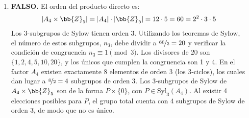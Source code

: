 \documentclass[12pt]{article}
\begin{document}
\begin{ejercicio}[1.0 punto]
\begin{enumerate}[label=\arabic*)]
            \item \textbf{FALSO.} El orden del producto directo es:
            $$|A_4 \times \bb{Z}_5| = |A_4| \cdot |\bb{Z}_5| = 12 \cdot 5 = 60 = 2^2 \cdot 3 \cdot 5$$ Los 3-subgrupos de Sylow tienen orden 3. Utilizando los teoremas de Sylow, el número de estos subgrupos, $n_3$, debe dividir a $\nicefrac{60}{3} = 20$ y verificar la condición de congruencia $n_3 \equiv 1 \pmod 3$. Los divisores de 20 son $\{1, 2, 4, 5, 10, 20\}$, y los únicos que cumplen la congruencia son 1 y 4. En el factor $A_4$ existen exactamente 8 elementos de orden 3 (los 3-ciclos), los cuales dan lugar a $\nicefrac{8}{2} = 4$ subgrupos de orden 3. Los 3-subgrupos de Sylow de $A_4 \times \bb{Z}_5$ son de la forma $P \times \{0\}$, con $P \in \text{Syl}_3(A_4)$. Al existir 4 elecciones posibles para $P$, el grupo total cuenta con 4 subgrupos de Sylow de orden 3, de modo que no es único.
        \end{enumerate}
    \end{ejercicio}
\end{document}
